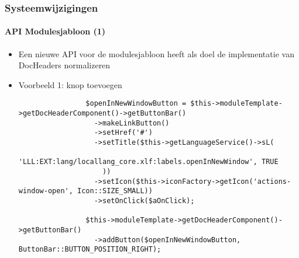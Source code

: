 \begin{frame}[fragile]
	\frametitle{Systeemwijzigingen}
	\framesubtitle{API Modulesjabloon (1)}

	\lstset{basicstyle=\tiny\ttfamily}

	\begin{itemize}

		\item Een nieuwe API voor de modulesjabloon heeft als doel de implementatie van DocHeaders normalizeren

		\item Voorbeeld 1: knop toevoegen

			\begin{lstlisting}
				$openInNewWindowButton = $this->moduleTemplate->getDocHeaderComponent()->getButtonBar()
				  ->makeLinkButton()
				  ->setHref('#')
				  ->setTitle($this->getLanguageService()->sL(
				    'LLL:EXT:lang/locallang_core.xlf:labels.openInNewWindow', TRUE
				    ))
				  ->setIcon($this->iconFactory->getIcon('actions-window-open', Icon::SIZE_SMALL))
				  ->setOnClick($aOnClick);

				$this->moduleTemplate->getDocHeaderComponent()->getButtonBar()
				  ->addButton($openInNewWindowButton, ButtonBar::BUTTON_POSITION_RIGHT);
			\end{lstlisting}
	\end{itemize}

\end{frame}


